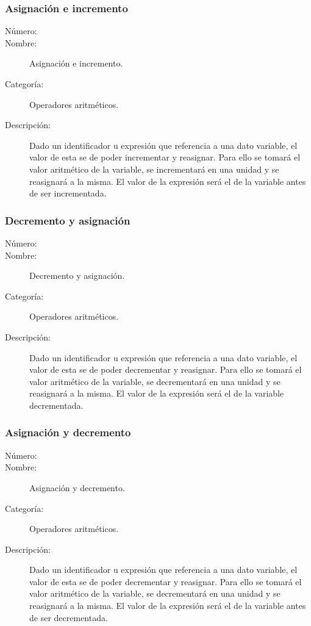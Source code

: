 \subsubsection{Asignación e incremento}
\begin{framed}
	\begin{description}
		\item [Número:] \cn
		\item [Nombre:] Asignación e incremento.
		\item [Categoría:] Operadores aritméticos.
		\item [Descripción:] Dado un identificador u expresión que referencia a una dato variable, el valor de esta se de poder incrementar y
		reasignar. Para ello se tomará el valor aritmético de la variable, se incrementará en una unidad y se reasignará a la misma.
		El valor de la expresión será el de la variable antes de ser incrementada.
	\end {description}
\end{framed}

\subsubsection{Decremento y asignación}
\begin{framed}
	\begin{description}
		\item [Número:] \cn
		\item [Nombre:] Decremento y asignación.
		\item [Categoría:] Operadores aritméticos.
		\item [Descripción:] Dado un identificador u expresión que referencia a una dato variable, el valor de esta se de poder decrementar y
		reasignar. Para ello se tomará el valor aritmético de la variable, se decrementará en una unidad y se reasignará a la misma.
		El valor de la expresión será el de la variable decrementada.
	\end {description}
\end{framed}

\subsubsection{Asignación y decremento}
\begin{framed}
	\begin{description}
		\item [Número:] \cn
		\item [Nombre:] Asignación y decremento.
		\item [Categoría:] Operadores aritméticos.
		\item [Descripción:] Dado un identificador u expresión que referencia a una dato variable, el valor de esta se de poder decrementar y
		reasignar. Para ello se tomará el valor aritmético de la variable, se decrementará en una unidad y se reasignará a la misma.
		El valor de la expresión será el de la variable antes de ser decrementada.
	\end {description}
\end{framed}

